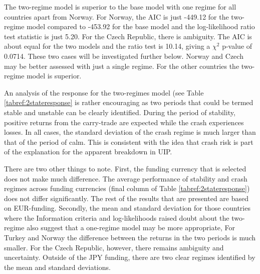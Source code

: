 \documentclass[12pt, a4paper, oneside]{article}\usepackage[]{graphicx}\usepackage[]{color}
\begin{document}
The two-regime model is superior to the base model with one regime for all countries apart from Norway.  For Norway, the AIC is just -449.12 for the two-regime model compared to -453.92 for the base model and the log-likelihood ratio test statistic is just 5.20.  For the Czech Republic, there is ambiguity.  The AIC is about equal for the two models and the ratio test is 10.14, giving a $\chi^2$ p-value of 0.0714. These two cases will be investigated further below. Norway and Czech may be better assessed with just a single regime. For the other countries the two-regime model is superior.  

An analysis of the response for the two-regimes model (see Table \ref{tabref:2stateresponse} is rather encouraging as two periods that could be termed stable and unstable can be clearly identified. During the period of stability, positive returns from the carry-trade are expected while the crash experiences losses.  In all cases, the standard deviation of the crash regime is much larger than that of the period of calm.  This is consistent with the idea that crash risk is part of the explanation for the apparent breakdown in UIP.  

There are two other things to note.  First, the funding currency that is selected does not make much difference.   The average performance of stability and crash regimes across funding currencies (final column of Table \ref{tabref:2stateresponse}) does not differ significantly.  The rest of the results that are presented are based on EUR-funding.  Secondly, the mean and standard deviation for those countries where the Information criteria and log-likelihoods raised doubt about the two-regime also suggest that a one-regime model may be more appropriate,   For Turkey and Norway the difference between the returns in the two periods is much smaller.  For the Czech Republic, however, there remains ambiguity and uncertainty. Outside of the JPY funding, there are two clear regimes identified by the mean and standard deviations. 
\end{document}
